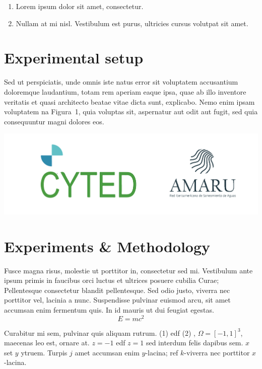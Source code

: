 \documentclass[portrait]{Hylangtechposter}
\begin{document}
\begin{multicols}{2}
\begin{enumerate}
\item Lorem ipsum dolor sit amet, consectetur.
\item Nullam at mi nisl. Vestibulum est purus, ultricies cursus volutpat sit amet.
\end{enumerate}

\section{Experimental setup}

Sed ut perspiciatis, unde omnis iste natus error sit voluptatem
accusantium doloremque laudantium, totam rem aperiam eaque ipsa, quae
ab illo inventore veritatis et quasi architecto beatae vitae dicta
sunt, explicabo. Nemo enim ipsam voluptatem na Figura~1, quia voluptas
sit, aspernatur aut odit aut fugit, sed quia consequuntur magni
dolores eos.

\begin{center}\vspace{1cm}
\includegraphics[width=0.5\linewidth]{Logo_CYTED_AMARU}
\end{center}\vspace{1cm}


\section{Experiments \& Methodology}

Fusce magna risus, molestie ut porttitor in, consectetur sed
mi. Vestibulum ante ipsum primis in faucibus orci luctus et ultrices
posuere cubilia Curae; Pellentesque consectetur blandit
pellentesque. Sed odio justo, viverra nec porttitor vel, lacinia a
nunc. Suspendisse pulvinar euismod arcu, sit amet accumsan enim
fermentum quis. In id mauris ut dui feugiat egestas. 
\begin{equation}
E = mc^{2}
\label{eqn:Einstein}
\end{equation}

Curabitur mi sem, pulvinar quis aliquam rutrum. (1) edf (2) ,
$\Omega=[-1,1]^3$, maecenas leo est, ornare at. $z=-1$ edf $z=1$ sed
interdum felis dapibus sem. $x$ set $y$ ytruem.  Turpis $j$ amet
accumsan enim $y$-lacina; ref $k$-viverra nec porttitor $x$-lacina.


\end{multicols}
\end{document}
